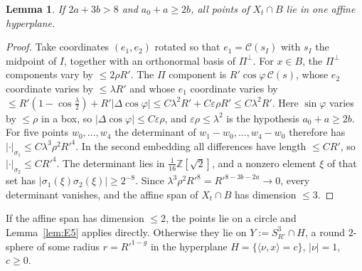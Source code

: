 \documentclass[aps,prx,twocolumn,superscriptaddress,nofootinbib,longbibliography]{revtex4-2}
\theoremstyle{plain}
\newtheorem{lemma}{Lemma}
\theoremstyle{definition}
\theoremstyle{remark}
\newcommand{\Z}{\mathbb{Z}}
\begin{document}
\begin{lemma}\label{lem:E1}
If $2a+3b>8$ and $a_0+a\ge2b$, all points of $X_t\cap B$ lie in one affine hyperplane.
\end{lemma}
\begin{proof}
Take coordinates $(e_1,e_2)$ rotated so that $e_1=\mathcal C(s_I)$ with $s_I$ the midpoint of $I$, together with an orthonormal basis of $\Pi^\perp$. For $x\in B$, the $\Pi^\perp$ components vary by $\le2\rho R'$. The $\Pi$ component is $R'\cos\varphi\,\mathcal C(s)$, whose $e_2$ coordinate varies by $\le\lambda R'$ and whose $e_1$ coordinate varies by $\le R'(1-\cos\tfrac\lambda2)+R'|\Delta\cos\varphi|\le C\lambda^2R'+C\varepsilon\rho R'\le C\lambda^2R'$. Here $\sin\varphi$ varies by $\le\rho$ in a box, so $|\Delta\cos\varphi|\le C\varepsilon\rho$, and $\varepsilon\rho\le\lambda^2$ is the hypothesis $a_0+a\ge2b$. For five points $w_0,\dots,w_4$ the determinant of $w_1-w_0,\dots,w_4-w_0$ therefore has $|\cdot|_{\sigma_1}\le C\lambda^3\rho^2R'^4$. In the second embedding all differences have length $\le CR'$, so $|\cdot|_{\sigma_2}\le CR'^4$. The determinant lies in $\tfrac1{16}\Z[\sqrt2]$, and a nonzero element $\xi$ of that set has $|\sigma_1(\xi)\sigma_2(\xi)|\ge2^{-8}$. Since $\lambda^3\rho^2R'^8=R'^{8-3b-2a}\to0$, every determinant vanishes, and the affine span of $X_t\cap B$ has dimension $\le3$.
\end{proof}

If the affine span has dimension $\le2$, the points lie on a circle and Lemma~\ref{lem:E5} applies directly. Otherwise they lie on $Y:=S^3_{R'}\cap H$, a round $2$-sphere of some radius $r=R'^{1-g}$ in the hyperplane $H=\{\langle\nu,x\rangle=c\}$, $|\nu|=1$, $c\ge0$.
\end{document}
